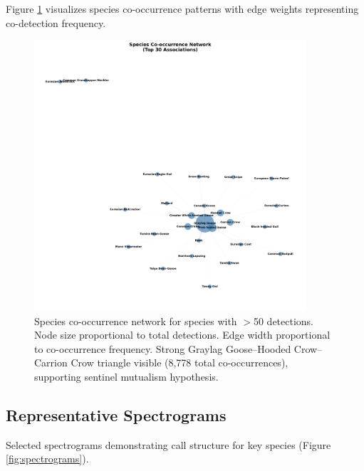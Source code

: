 \documentclass[twocolumn]{article}
\begin{document}
Figure \ref{fig:cooccurrence} visualizes species co-occurrence patterns with edge weights representing co-detection frequency.

\begin{figure}[H]
\centering
\includegraphics[width=0.9\textwidth]{figures/cooccurrence_network.png}
\caption{Species co-occurrence network for species with $>$50 detections. Node size proportional to total detections. Edge width proportional to co-occurrence frequency. Strong Graylag Goose--Hooded Crow--Carrion Crow triangle visible (8,778 total co-occurrences), supporting sentinel mutualism hypothesis.}
\label{fig:cooccurrence}
\end{figure}

\subsection{Representative Spectrograms}

Selected spectrograms demonstrating call structure for key species (Figure \ref{fig:spectrograms}).
\end{document}
